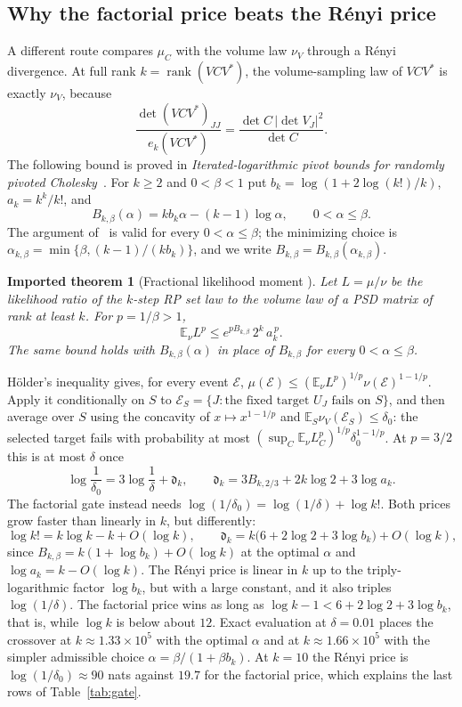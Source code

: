 \documentclass[11pt,a4paper]{article}
\newtheorem{imported}[theorem]{Imported theorem}
\theoremstyle{definition}
\theoremstyle{remark}
\newcommand{\E}{\mathbb E}
\newcommand{\rank}{\operatorname{rank}}
\newcommand{\1}{\mathbf 1}
\begin{document}
\subsection{Why the factorial price beats the R\'enyi price}\label{sec:renyi}
A different route compares $\mu_C$ with the volume law $\nu_V$ through
a R\'enyi divergence. At full rank $k=\rank(VCV^*)$, the
volume-sampling law of $VCV^*$ is exactly $\nu_V$, because
\[
 \frac{\det(VCV^*)_{JJ}}{e_k(VCV^*)}=\frac{\det C\,|\det V_J|^2}{\det C}.
\] The following
bound is proved in \emph{Iterated-logarithmic pivot bounds for randomly
pivoted Cholesky}~\cite{RA01}. For $k\ge2$ and $0<\beta<1$ put
$b_k=\log(1+2\log(k!)/k)$, $a_k=k^k/k!$, and
\[
 B_{k,\beta}(\alpha)=kb_k\alpha-(k-1)\log\alpha,\qquad
 0<\alpha\le\beta .
\]
The argument of~\cite{RA01} is valid for every $0<\alpha\le\beta$; the
minimizing choice is $\alpha_{k,\beta}=\min\{\beta,(k-1)/(kb_k)\}$, and we
write $B_{k,\beta}=B_{k,\beta}(\alpha_{k,\beta})$.

\begin{imported}[Fractional likelihood moment {\cite{RA01}}]\label{imp:renyi}
Let $L=\mu/\nu$ be the likelihood ratio of the $k$-step RP set law to
the volume law of a PSD matrix of rank at least $k$. For $p=1/\beta>1$,
\[
 \E_\nu L^p\le e^{pB_{k,\beta}}\,2^k\,a_k^{\,p}.
\]
The same bound holds with $B_{k,\beta}(\alpha)$ in place of $B_{k,\beta}$
for every $0<\alpha\le\beta$.
\end{imported}

H\"older's inequality gives, for every event $\mathcal E$,
$\mu(\mathcal E)\le(\E_\nu L^p)^{1/p}\nu(\mathcal E)^{1-1/p}$. Apply it
conditionally on $S$ to $\mathcal E_S=\{J:\text{the fixed target }U_J
\text{ fails on }S\}$, and then average over $S$ using the concavity of
$x\mapsto x^{1-1/p}$ and $\E_S\nu_V(\mathcal E_S)\le\delta_0$: the selected
target fails with probability at most
$(\sup_C\E_\nu L_C^p)^{1/p}\delta_0^{1-1/p}$. At $p=3/2$
this is at most $\delta$ once
\[
 \log\frac1{\delta_0}=3\log\frac1\delta+\mathfrak d_k,\qquad
 \mathfrak d_k=3B_{k,2/3}+2k\log2+3\log a_k .
\]
The factorial gate instead needs $\log(1/\delta_0)=\log(1/\delta)+\log k!$.
Both prices grow faster than linearly in $k$, but differently:
\[
 \log k!=k\log k-k+O(\log k),\qquad
 \mathfrak d_k=k\bigl(6+2\log2+3\log b_k\bigr)+O(\log k),
\]
since $B_{k,\beta}=k(1+\log b_k)+O(\log k)$ at the optimal $\alpha$ and
$\log a_k=k-O(\log k)$. The R\'enyi price is linear in $k$ up to the
triply-logarithmic factor $\log b_k$, but with a large constant, and it
also triples $\log(1/\delta)$. The factorial price wins as long as
$\log k-1<6+2\log2+3\log b_k$, that is, while $\log k$ is below about
$12$. Exact evaluation at $\delta=0.01$ places the crossover at
$k\approx1.33\times10^5$ with the optimal $\alpha$ and at
$k\approx1.66\times10^5$ with the simpler admissible choice $\alpha=\beta/(1+\beta b_k)$.
At $k=10$ the R\'enyi price is $\log(1/\delta_0)\approx90$ nats against
$19.7$ for the factorial price, which explains the last rows of
Table~\ref{tab:gate}.
\end{document}
